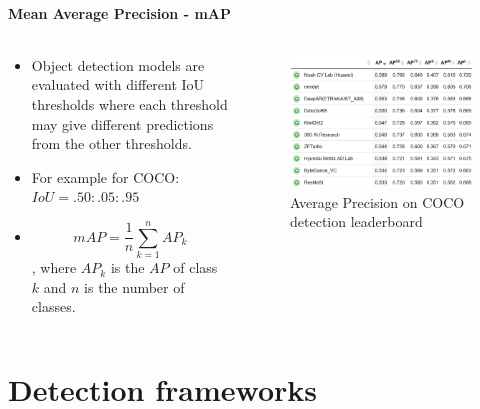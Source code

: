 \documentclass{beamer}
\begin{document}
\subsection{Mean Average Precision - mAP}
\begin{frame}{}
	\begin{columns}
		\begin{column}{0.5\textwidth}
			\begin{itemize}
				\item Object detection models are evaluated with different IoU thresholds where each threshold may give different predictions from the other thresholds.
				\item For example for COCO: $IoU=.50:.05:.95$
				\item $$ mAP = \frac{1}{n} \sum_{k=1}^{n} AP_k $$, where $AP_k$ is the $AP$ of class $k$ and $n$ is the number of classes.
			\end{itemize}
		\end{column}
		\begin{column}{0.5\textwidth}
			\begin{figure}
				\includegraphics[width=\textwidth]{images/coco_leaderboard.png}
				\caption{Average Precision on COCO detection leaderboard}
			\end{figure}
		\end{column} 
	\end{columns}
\end{frame}



\part{Detection frameworks}
\begin{frame}
	\partpage
\end{frame}
\end{document}
